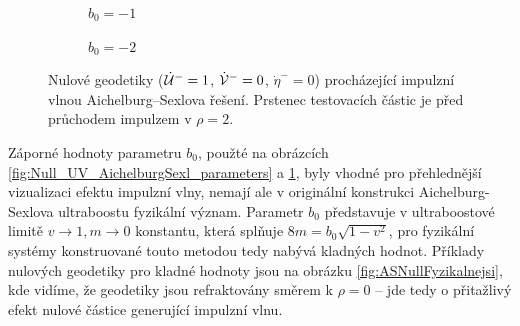\begin{figure}[h]
    \centering
    \begin{subfigure}[b]{0.45\textwidth}
        \caption{$b_0 = -1$}
    \end{subfigure}
    \hfill
    \begin{subfigure}[b]{0.45\textwidth}
        \caption{$b_0 = -2$}
    \end{subfigure}
    \caption{Nulové geodetiky ($\dot {\mathcal{U}}^-=1$, $\dot {\mathcal{V}}^-=0$, $\dot \eta^-=0$) procházející impulzní vlnou Aichelburg--Sexlova řešení. Prstenec testovacích částic je před průchodem impulzem v $\rho=2$.}
    \label{fig:NullASRing01}
\end{figure}

Záporné hodnoty parametru $b_0$, použté na obrázcích \ref{fig:Null_UV_AichelburgSexl_parameters} a \ref{fig:NullASRing01}, byly vhodné pro přehlednější vizualizaci
efektu impulzní vlny, nemají ale v originální konstrukci Aichelburg-Sexlova ultraboostu fyzikální význam. Parametr $b_0$
představuje v ultraboostové limitě $v \to 1, m \to 0$ konstantu, která splňuje $8m = b_0\sqrt{1-v^2}$, pro fyzikální systémy konstruované touto metodou
tedy nabývá kladných hodnot. Příklady nulových geodetiky pro kladné hodnoty jsou na obrázku \ref{fig:ASNullFyzikalnejsi}, kde vidíme,
že geodetiky jsou refraktovány směrem k $\rho=0$ -- jde tedy o přitažlivý efekt nulové částice generující impulzní vlnu.

